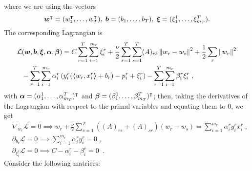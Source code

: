 where we are using the vectors
\begin{equation}
    \nonumber
    \bm{w}^\intercal = (w_1^\intercal, \ldots, w_T^\intercal), \; \bm{b} = (b_1, \ldots, b_T), \; \bm{\xi} = (\xi_{1}^1, \ldots, \xi_{m_T}^T).
\end{equation}
The corresponding Lagrangian is
\begin{equation}\label{eq:svmmtl_lagr_GL_addreg}
    \begin{aligned}
        \mathcal{L} & (\fv{w}, \fv{b}, \fv{\xi}, \fv{\alpha}, \fv{\beta}) = C \sum_{r=1}^T \sum_{i=1}^{m_r}{\xi_{i}^r} + \frac{\nu}{2} \sum_{r=1}^T \sum_{s=1}^T (A)_{rs} \norm{w_r - w_s}^2 + \frac{1}{2} \sum_r \norm{w_r}^2 \\
                    & - \sum_{r=1}^T \sum_{i=1}^{m_r}{ \alpha_i^r \left( y_{i}^r (\dotp{w_r}{x_{i}^r} + b_r) - p_{i}^r + \xi_{i}^r \right)  } - \sum_{r=1}^T \sum_{i=1}^{m_r}{ \beta_i^r \xi_i^r } \; ,
    \end{aligned}
\end{equation}
with $\bm{\alpha} = (\alpha_{1}^1, \ldots, \alpha_{m_T}^T)^\intercal$ and $\bm{\beta} = (\beta_{1}^1, \ldots, \beta_{m_T}^T)^\intercal$;
then, taking the derivatives of the Lagrangian with respect to the primal variables and equating them to $0$, we get
\begin{align}
     & \nabla_{w_r} \mathcal{L} = 0 \implies  w_r + \frac{\nu}{2} \sum_{s=1}^T ((A)_{rs} + (A)_{sr}) (w_r - w_s)= \sum_{i=1}^{m_r}{\alpha_i^r y_i^r x_i^r} \label{eq:partial_w_r_addreg} \; , \\
     & \partial_{b_r} \mathcal{L} = 0 \implies  \sum_{i=1}^{m_r}{\alpha_i^r y_i^r } = 0 \label{eq:partial_b_r_addreg} \; ,                                                                        \\
     & \partial_{\xi_i^r} \mathcal{L} = 0 \implies C - \alpha_i^r - \beta_i^r = 0 \; \label{eq:partial_xi_addreg}\; .
\end{align}
Consider
the following matrices: %

